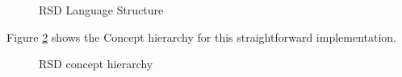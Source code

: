 \begin{figure}[h]
    \centering
    \caption{RSD Language Structure}
    \label{fig:RSDStructure}
\end{figure}

\newpage
Figure \ref{fig:RSDDiagram} shows the Concept hierarchy for this straightforward implementation.

\begin{figure}[H]
    \centering
    \caption{RSD concept hierarchy}
    \label{fig:RSDDiagram}
\end{figure}

